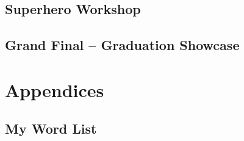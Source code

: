 \chapter{Superhero Workshop}\label{ch:s23}

\newpage
\chapter{Grand Final -- Graduation Showcase}\label{ch:s24}


\clearpage
{}
\part{Appendices}
\newpage
\chapter{My Word List}\label{ch:wordlist}


